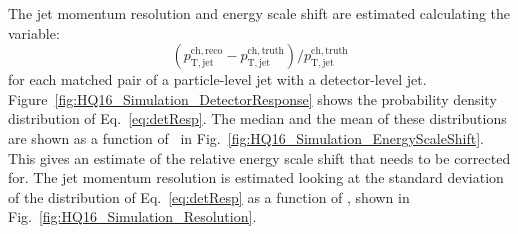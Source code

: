 The jet momentum resolution and energy scale shift are estimated calculating the variable:
\begin{equation}
(p_{\mathrm{T,jet}}^{\mathrm{ch,reco}} - p_{\mathrm{T,jet}}^{\mathrm{ch,truth}}) / p_{\mathrm{T,jet}}^{\mathrm{ch,truth}}
\label{eq:detResp}
\end{equation}
for each matched pair of a particle-level jet with a detector-level jet.
Figure~\ref{fig:HQ16_Simulation_DetectorResponse} shows the probability density distribution of Eq.~\ref{eq:detResp}.
The median and the mean of these distributions are shown as a function of \ptchjetgen\ in Fig.~\ref{fig:HQ16_Simulation_EnergyScaleShift}.
This gives an estimate of the relative energy scale shift that needs to be corrected for.
The jet momentum resolution is estimated looking at the standard deviation of the distribution of Eq.~\ref{eq:detResp} as a function
of \ptchjetgen, shown in Fig.~\ref{fig:HQ16_Simulation_Resolution}.
